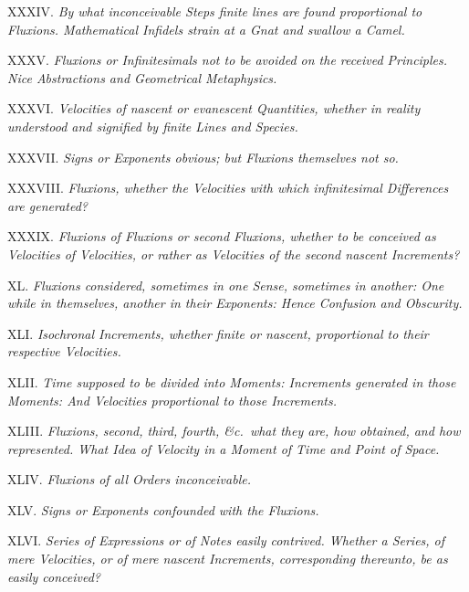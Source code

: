 \item{XXXIV.}
{\it
By what inconceivable Steps finite lines are found proportional
to Fluxions.  Mathematical Infidels strain at a Gnat and swallow
a Camel.}

\item{XXXV.}
{\it
Fluxions or Infinitesimals not to be avoided on the received
Principles.  Nice Abstractions and Geometrical Metaphysics.}

\item{XXXVI.}
{\it
Velocities of nascent or evanescent Quantities, whether in
reality understood and signified by finite Lines and Species.}

\item{XXXVII.}
{\it
Signs or Exponents obvious; but Fluxions themselves not so.}

\item{XXXVIII.}
{\it
Fluxions, whether the Velocities with which infinitesimal
Differences are generated?}

\item{XXXIX.}
{\it
Fluxions of Fluxions or second Fluxions, whether to be conceived
as Velocities of Velocities, or rather as Velocities of the
second nascent Increments?}

\item{XL.}
{\it
Fluxions considered, sometimes in one Sense, sometimes in
another: One while in themselves, another in their Exponents:
Hence Confusion and Obscurity.}

\item{XLI.}
{\it
Isochronal Increments, whether finite or nascent, proportional to
their respective Velocities.}

\item{XLII.}
{\it
Time supposed to be divided into Moments: Increments generated in
those Moments: And Velocities proportional to those Increments.}

\item{XLIII.}
{\it
Fluxions, second, third, fourth, {\it \&c.}\ what they are, how
obtained, and how represented.  What Idea of Velocity in a Moment
of Time and Point of Space.}

\item{XLIV.}
{\it
Fluxions of all Orders inconceivable.}

\item{XLV.}
{\it
Signs or Exponents confounded with the Fluxions.}

\item{XLVI.}
{\it
Series of Expressions or of Notes easily contrived.  Whether a
Series, of mere Velocities, or of mere nascent Increments,
corresponding thereunto, be as easily conceived?}

